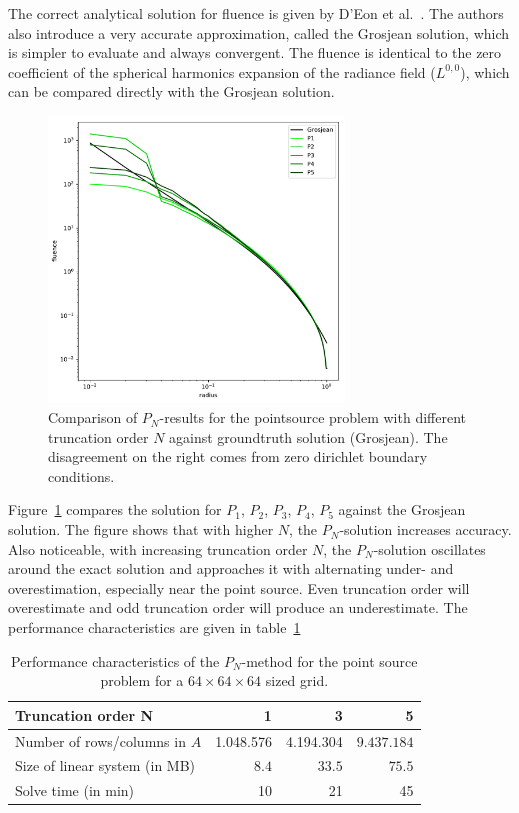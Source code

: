 The correct analytical solution for fluence is given by D'Eon et al.~\cite{dEon11}. The authors also introduce a very accurate approximation, called the Grosjean solution, which is simpler to evaluate and always convergent. The fluence is identical to the zero coefficient of the spherical harmonics expansion of the radiance field ($L^{0,0}$), which can be compared directly with the Grosjean solution.
\begin{figure}[h]
\centering
\includegraphics[width=0.7\textwidth]{04_pn_method/results/pointsource_pn.pdf}
\caption{Comparison of $P_N$-results for the pointsource problem with different truncation order $N$ against groundtruth solution (Grosjean). The disagreement on the right comes from zero dirichlet boundary conditions.}
\label{fig:pn_results_pointsource_1}
\end{figure}
Figure~\ref{fig:pn_results_pointsource_1} compares the solution for $P_1$, $P_2$, $P_3$, $P_4$, $P_5$ against the Grosjean solution. The figure shows that with higher $N$, the $P_N$-solution increases accuracy. Also noticeable, with increasing truncation order $N$, the $P_N$-solution oscillates around the exact solution and approaches it with alternating under- and overestimation, especially near the point source. Even truncation order will overestimate and odd truncation order will produce an underestimate. The performance characteristics are given in table~\ref{tab:results_pointsource}

\begin{table}[!h]
	\centering
	\caption{Performance characteristics of the $P_N$-method for the point source problem for a $64\times64\times64$ sized grid.}
	\label{tab:results_pointsource}
	\begin{tabular}{l r r r}
    \hline
	Truncation order \textbf{N}
    & 1 & 3 & 5
    \\
    \hline
    Number of rows/columns in $A$
    & 1.048.576 & 4.194.304 & $9.437.184$
    \\
    Size of linear system (in MB)
    & $8.4$ & $33.5$ & $75.5$
    \\
    Solve time (in min)
    & 10 & 21 & 45
	\end{tabular}
\end{table}

